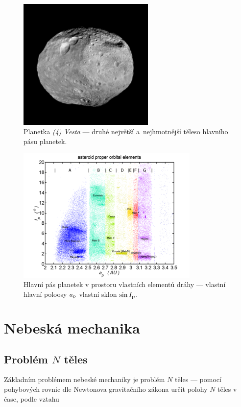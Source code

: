 \documentclass[a4paper, 12pt]{article}
\begin{document}
\begin{figure}[!ht]
	\centering
	\includegraphics[width=0.6\textwidth]{../../obr/vesta.jpg}
	\caption{Planetka \textit{(4) Vesta} --- druhé největší a~nejhmotnější těleso hlavního pásu planetek.} 
	\label{fig:vesta}
\end{figure}
\begin{figure}[!hb]
	\centering
	\includegraphics[width=0.8\textwidth]{../../obr/mainbelt.png}
	\caption{Hlavní pás planetek v prostoru vlastních elementů dráhy --- vlastní hlavní poloosy $a_{\rm p}$ vlastní sklon $\sin I_{\rm p}$.} \label{fig:belt}
\end{figure}

\section{Nebeská mechanika}

\subsection{Problém $N$ těles}
Základním problémem nebeské mechaniky je problém $N$ těles --- pomocí pohybových rovnic dle Newtonova gravitačního zákona určit polohy $N$ těles v čase, podle vztahu
\end{document}

